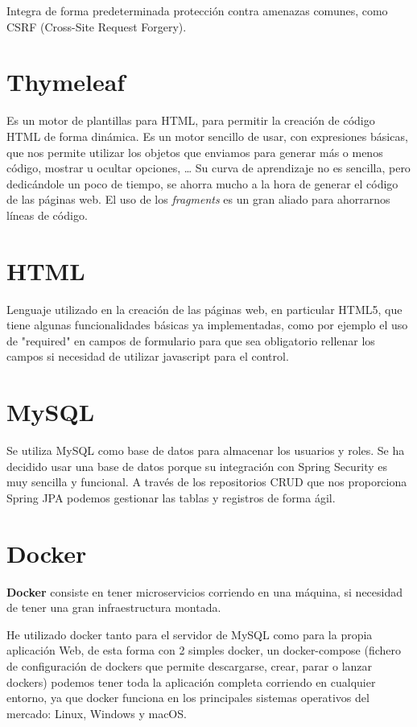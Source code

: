 Integra de forma predeterminada protección contra amenazas comunes, como CSRF (Cross-Site Request Forgery).

\section{Thymeleaf}

Es un motor de plantillas para HTML, para permitir la creación de código HTML de forma dinámica.
Es un motor sencillo de usar, con expresiones básicas, que nos permite utilizar los objetos que enviamos para generar más o menos código, mostrar u ocultar opciones, \dots
Su curva de aprendizaje no es sencilla, pero dedicándole un poco de tiempo, se ahorra mucho a la hora de generar el código de las páginas web.
El uso de los \textit{fragments} es un gran aliado para ahorrarnos líneas de código.

\section{HTML}

Lenguaje utilizado en la creación de las páginas web, en particular HTML5, que tiene algunas funcionalidades básicas ya implementadas, como por ejemplo el uso de "required" en campos de formulario para que sea obligatorio rellenar los campos si necesidad de utilizar javascript para el control.

\section{MySQL}

Se utiliza MySQL como base de datos para almacenar los usuarios y roles.
Se ha decidido usar una base de datos porque su integración con Spring Security es muy sencilla y funcional. 
A través de los repositorios CRUD que nos proporciona Spring JPA podemos gestionar las tablas y registros de forma ágil.

\section{Docker}

\textbf{Docker} consiste en tener microservicios corriendo en una máquina, si necesidad de tener una gran infraestructura montada.

He utilizado docker tanto para el servidor de MySQL como para la propia aplicación Web, de esta forma con 2 simples docker, un docker-compose (fichero de configuración de dockers que permite descargarse, crear, parar o lanzar dockers) podemos tener toda la aplicación completa corriendo en cualquier entorno, ya que docker funciona en los principales sistemas operativos del mercado: Linux, Windows y macOS.

